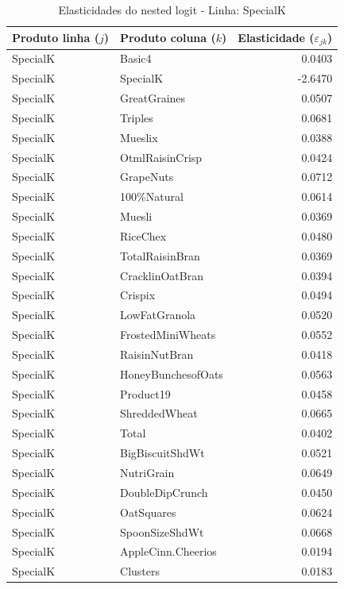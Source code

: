 
\begingroup
\begin{table}[H]
\centering
\caption{Elasticidades do nested logit - Linha: SpecialK}
\label{tab:elas-nested-specialk}
\small
\begin{tabular}{llr}
\toprule
Produto linha ($j$) & Produto coluna ($k$) & Elasticidade ($\varepsilon_{jk}$) \\
\midrule
SpecialK & Basic4 & 0.0403 \\
SpecialK & SpecialK & -2.6470 \\
SpecialK & GreatGraines & 0.0507 \\
SpecialK & Triples & 0.0681 \\
SpecialK & Mueslix & 0.0388 \\
SpecialK & OtmlRaisinCrisp & 0.0424 \\
SpecialK & GrapeNuts & 0.0712 \\
SpecialK & 100\%Natural & 0.0614 \\
SpecialK & Muesli & 0.0369 \\
SpecialK & RiceChex & 0.0480 \\
SpecialK & TotalRaisinBran & 0.0369 \\
SpecialK & CracklinOatBran & 0.0394 \\
SpecialK & Crispix & 0.0494 \\
SpecialK & LowFatGranola & 0.0520 \\
SpecialK & FrostedMiniWheats & 0.0552 \\
SpecialK & RaisinNutBran & 0.0418 \\
SpecialK & HoneyBunchesofOats & 0.0563 \\
SpecialK & Product19 & 0.0458 \\
SpecialK & ShreddedWheat & 0.0665 \\
SpecialK & Total & 0.0402 \\
SpecialK & BigBiscuitShdWt & 0.0521 \\
SpecialK & NutriGrain & 0.0649 \\
SpecialK & DoubleDipCrunch & 0.0450 \\
SpecialK & OatSquares & 0.0624 \\
SpecialK & SpoonSizeShdWt & 0.0668 \\
SpecialK & AppleCinn.Cheerios & 0.0194 \\
SpecialK & Clusters & 0.0183 \\

\end{tabular}
\end{table}
